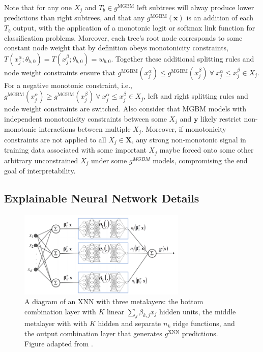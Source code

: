 \documentclass[information,article,submit,moreauthors,pdftex]{definitions/mdpi}
\begin{document}
\noindent Note that for any one $X_j$ and $T_b \in g^{\text{MGBM}}$ left subtrees will alway produce lower predictions than right subtrees, and that any $g^{\text{MGBM}}(\mathbf{x})$ is an addition of each $T_b$ output, with the application of a monotonic logit or softmax link function for classification problems. Moreover, each tree's root node corresponds to some constant node weight that by definition obeys monotonicity constraints, $ T(x^{\alpha}_j; \theta_{b,0}) = T(x^{\beta}_j; \theta_{b,0}) = w_{b,0}$. Together these additional splitting rules and node weight constraints ensure that $g^{\text{MGBM}}(x^{\alpha}_j)  \le g^{\text{MGBM}}(x^{\beta}_j) ~\forall ~x^{\alpha}_j \le x^{\beta}_j \in X_j$. For a negative monotonic constraint, i.e., $g^{\text{MGBM}}(x^{\alpha}_j)  \ge g^{\text{MGBM}}(x^{\beta}_j) ~\forall ~x^{\alpha}_j \le x^{\beta}_j \in X_j$, left and right splitting rules and node weight constraints are switched. Also consider that MGBM models with independent monotonicity constraints between some $X_j$ and $\mathbf{y}$ likely restrict non-monotonic interactions between multiple $X_j$. Moreover, if monotonicity constraints are not applied to all $X_j \in \mathbf{X}$, any strong non-monotonic signal in training data associated with some important $X_j$ maybe forced onto some other arbitrary unconstrained $X_j$ under some $g^{MGBM}$ models, compromising the end goal of interpretability.

\subsection{Explainable Neural Network Details}\label{a_ssec:xnn}

\begin{figure}[H]
	\centering
	\includegraphics[width=8cm]{img/xnn_arch.png}
	\caption{A diagram of an XNN with three metalayers: the bottom combination layer with  $K$ linear $\sum_j\beta_{k,j}x_j$ hidden units, the middle metalayer with with $K$ hidden and separate $n_k$ ridge functions, and the output combination layer that generates $g^{\text{XNN}}$ predictions. Figure adapted from \citet{wf_xnn}.}
	\label{fig:xnn_arch}
\end{figure}  
\end{document}
